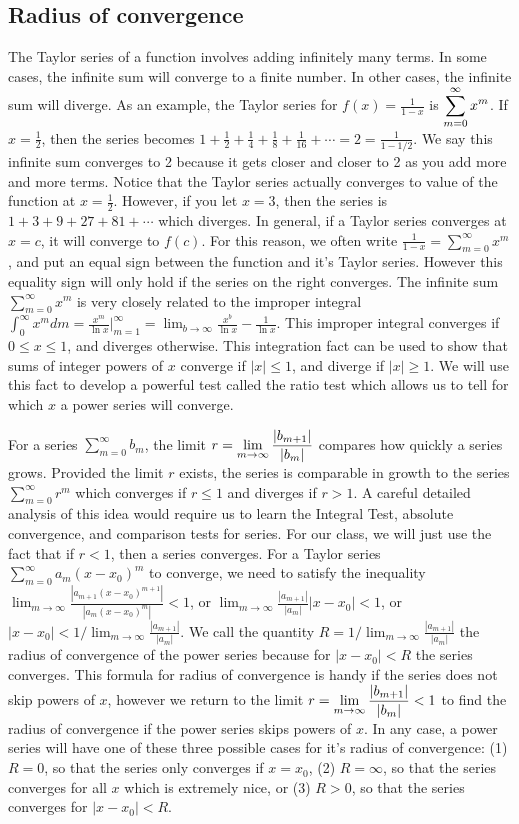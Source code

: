 \subsection{Radius of convergence}
The Taylor series of a function involves adding infinitely many terms.  In some cases, the infinite sum will converge to a finite number. In other cases, the infinite sum will diverge. As an example, the Taylor series for $f(x) = \frac{1}{1-x}$ is $\displaystyle  \sum_{m=0}^\infty x^m$. If $x=\frac{1}{2}$, then the series becomes $1+\frac{1}{2}+\frac{1}{4}+\frac{1}{8}+\frac{1}{16}+\cdots=2 = \frac{1}{1-1/2}$. We say this infinite sum converges to 2 because it gets closer and closer to 2 as you add more and more terms. Notice that the Taylor series actually converges to value of the function at $x=\frac{1}{2}$.  However, if you let $x=3$, then the series is $1+3+9+27+81+\cdots$ which diverges. In general, if a Taylor series converges at $x=c$, it will converge to $f(c)$. For this reason, we often write $\frac{1}{1-x} = \sum_{m=0}^\infty x^m$, and put an equal sign between the function and it's Taylor series.  However this equality sign will only hold if the series on the right converges. The infinite sum $\sum_{m=0}^\infty x^m$ is very closely related to the improper integral $\int_0^\infty x^m dm = \frac{x^m}{\ln x}\big|_{m=1}^\infty = \lim_{b\to\infty}\frac{x^b}{\ln x} - \frac{1}{\ln x}$. This improper integral converges if $0\leq x\leq 1$, and diverges otherwise. This integration fact can be used to show that sums of integer powers of $x$ converge if $|x|\leq 1$, and diverge if $|x|\geq 1$. We will use this fact to develop a powerful test called the ratio test which allows us to tell for which $x$ a power series will converge. 

For a series $\sum_{m=0}^\infty b_m$, the limit $\displaystyle r=\lim_{m\to\infty}\frac{|b_{m+1}|}{|b_m|}$ compares how quickly a series grows.  Provided the limit $r$ exists, the series is comparable in growth to the series $\sum_{m=0}^\infty r^m$ which converges if $r\leq 1$ and diverges if $r>1$. A careful detailed analysis of this idea would require us to learn the Integral Test, absolute convergence, and comparison tests for series.  For our class, we will just use the fact that if $r<1$, then a series converges. For a Taylor series $\sum_{m=0}^\infty a_m (x-x_0)^m$ to converge, we need to satisfy the inequality $\lim_{m\to\infty}\frac{|a_{m+1}(x-x_0)^{m+1}|}{|a_m (x-x_0)^m|}<1$, or $\lim_{m\to\infty}\frac{|a_{m+1}|}{|a_m|}|x-x_0|<1$, or $|x-x_0|<1/ \lim_{m\to\infty}\frac{|a_{m+1}|}{|a_m|}$. We call the quantity $R=1/ \lim_{m\to\infty}\frac{|a_{m+1}|}{|a_m|}$ the radius of convergence of the power series because for $|x-x_0|<R$ the series converges. This formula for radius of convergence is handy if the series does not skip powers of $x$, however we return to the limit $\displaystyle r=\lim_{m\to\infty}\frac{|b_{m+1}|}{|b_m|}<1$ to find the radius of convergence if the power series skips powers of $x$. In any case, a power series will have one of these three possible cases for it's radius of convergence: (1) $R=0$, so that the series only converges if $x=x_0$, (2) $R=\infty$, so that the series converges for all $x$ which is extremely nice, or (3) $R>0$, so that the series converges for $|x-x_0|<R$.

